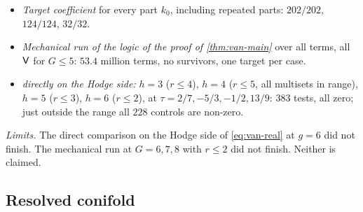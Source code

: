 \begin{itemize}
\item \emph{Target coefficient} for every part $k_0$, including repeated parts: $202/202$, $124/124$, $32/32$.
\item \emph{Mechanical run of the logic of the proof of \cref{thm:van-main}} over all terms, all $\mathsf{V}$ for $G\leq 5$: $53.4$ million terms, no survivors, one target per case.
\item \emph{ directly on the Hodge side:} $h=3$ ($r\leq 4$), $h=4$ ($r\leq 5$, all multisets in range), $h=5$ ($r\leq 3$), $h=6$ ($r\leq 2$), at $\tau=2/7,-5/3,-1/2,13/9$: $383$ tests, all zero; just outside the range all $228$ controls are non-zero.
\end{itemize}

\emph{Limits.} The direct comparison on the Hodge side of \cref{eq:van-real} at $g=6$ did not finish. The mechanical run at $G=6,7,8$ with $r\leq 2$ did not finish. Neither is claimed.

\subsection{Resolved conifold}
\label{sec:evi-con}

